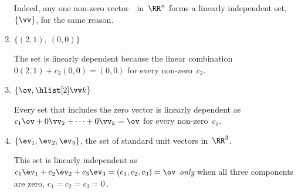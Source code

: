 \begin{example}
\begin{enumerate}
\begin{solution}
Indeed, any one non-zero vector~\vv\ in~\(\RR^n\) forms a linearly independent set,~\(\{\vv\}\), for the same reason.
\end{solution}


\item \(\{(2,1),\ (0,0)\}\) 
\begin{solution} 
The set is linearly dependent because the linear combination  \(0(2,1)+c_2(0,0)=(0,0)\) for every non-zero~\(c_2\). 
\end{solution}

\item \(\{\ov,\hlist[2]\vv k\}\)
\begin{solution} 
Every  set that includes the zero vector is linearly dependent as
\(c_1\ov+0\vv_2+\cdots+0\vv_k=\ov\) for every non-zero~\(c_1\).
\end{solution}

\item \(\{\ev_1,\ev_2,\ev_3\}\), the set of standard unit vectors in~\(\RR^3\).
\begin{solution} 
This set is linearly independent as
\(c_1\ev_1+c_2\ev_2+c_3\ev_3=(c_1,c_2,c_3)=\ov\)
\emph{only} when all three components are zero, \(c_1=c_2=c_3=0\)\,. 
\end{solution}


\end{enumerate}
\end{example}
